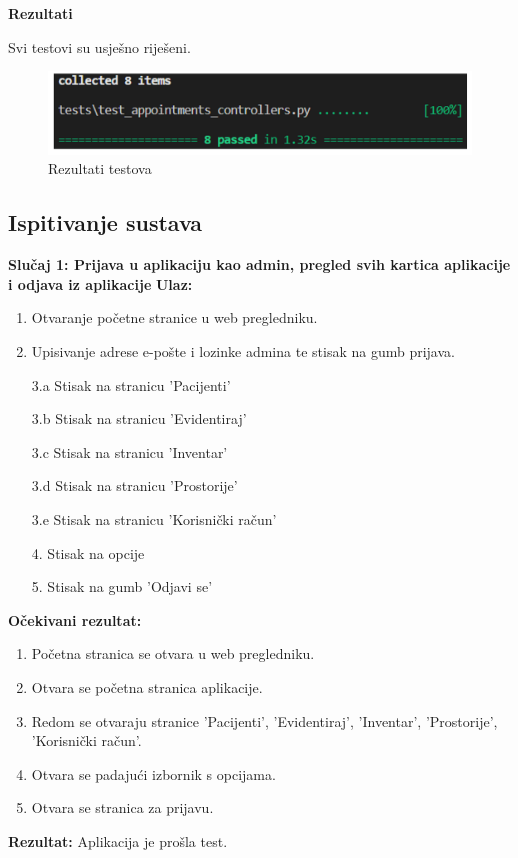 	 \textbf{Rezultati}
	 
	 
	 Svi testovi su usješno riješeni.
	 
	 \begin{figure}[H]
				\includegraphics[scale=0.3]{slike/rezultati_testova.PNG} %
				\centering
				\caption{Rezultati testova}
				\label{fig:rezultati_testova}
			\end{figure}
	 
	 
			

			
			\subsection{Ispitivanje sustava}
			

\textbf{Slučaj 1: Prijava u aplikaciju kao admin, pregled svih kartica aplikacije i odjava iz aplikacije}
\textbf{Ulaz:}
\begin{enumerate}
    \item Otvaranje početne stranice u web pregledniku.
    \item Upisivanje adrese e-pošte i lozinke admina te stisak na gumb prijava.
    \item[3.a] Stisak na stranicu 'Pacijenti'
    \item[3.b] Stisak na stranicu 'Evidentiraj'
    \item[3.c] Stisak na stranicu 'Inventar'
    \item[3.d] Stisak na stranicu 'Prostorije'
    \item[3.e] Stisak na stranicu 'Korisnički račun'
    \item[4.] Stisak na opcije
    \item[5.] Stisak na gumb 'Odjavi se'
\end{enumerate}
\textbf{Očekivani rezultat:}
\begin{enumerate}
    \item Početna stranica se otvara u web pregledniku.
    \item Otvara se početna stranica aplikacije.
    \item Redom se otvaraju stranice 'Pacijenti', 'Evidentiraj', 'Inventar', 'Prostorije', 'Korisnički račun'.
    \item Otvara se padajući izbornik s opcijama.
    \item Otvara se stranica za prijavu.
\end{enumerate}
\textbf{Rezultat:} Aplikacija je prošla test.

